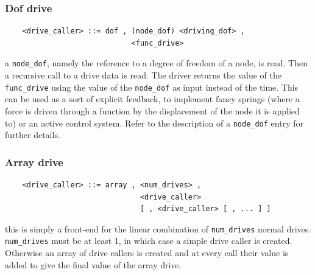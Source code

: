 \documentclass[10pt,dvips]{report}
\begin{document}
\subsubsection{Dof drive}
\begin{verbatim}
    <drive_caller> ::= dof , (node_dof) <driving_dof> ,
                             <func_drive>
\end{verbatim}
a {\tt node\_dof}, namely the reference to a degree of freedom of a node,
is read. 
Then a recursive call to a drive data is read. 
The driver returns the value of the {\tt func\_drive} using the value of the 
{\tt node\_dof} as input instead of the time. 
This can be used as a sort of explicit feedback, to implement fancy
springs (where a force is driven through a function by the displacement
of the node it is applied to) or an active control system. 
Refer to the description of a {\tt node\_dof} entry for further details.

\subsubsection{Array drive}
\begin{verbatim}
    <drive_caller> ::= array , <num_drives> ,
                               <drive_caller> 
                               [ , <drive_caller> [ , ... ] ]
\end{verbatim}
this is simply a front-end for the linear combination of {\tt num\_drives} 
normal drives. \\
{\tt num\_drives} must be at least 1, in which case a simple drive
caller is created. 
Otherwise an array of drive callers is created and at every call their value 
is added to give the final value of the array drive.
\end{document}
